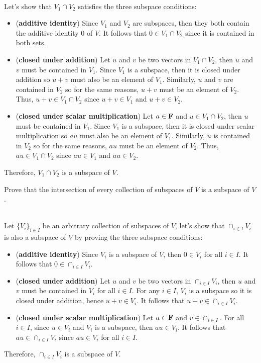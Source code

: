 \begin{solution}
    \\ Let's show that $V_1 \cap V_2$ satisfies the three subspace conditions:
    \begin{itemize}
        \item (\textbf{additive identity}) Since $V_1$ and $V_2$ are subspaces, then they both contain the additive identity $0$ of $V$. It follows that $0 \in V_1 \cap V_2$ since it is contained in both sets.
        \item (\textbf{closed under addition}) Let $u$ and $v$ be two vectors in $V_1 \cap V_2$, then $u$ and $v$ must be contained in $V_1$. Since $V_1$ is a subspace, then it is closed under addition so $u+v$ must also be an element of $V_1$. Similarly, $u$ and $v$ are contained in $V_2$ so for the same reasons, $u+v$ must be an element of $V_2$. Thus, $u+v \in V_1 \cap V_2$ since $u+v \in V_1$ and $u+v \in V_2$.
        \item (\textbf{closed under scalar multiplication}) Let $a \in \mathbf{F}$ and $u \in V_1 \cap V_2$, then $u$ must be contained in $V_1$. Since $V_1$ is a subspace, then it is closed under scalar multiplication so $au$ must also be an element of $V_1$. Similarly, $u$ is contained in $V_2$ so for the same reasons, $au$ must be an element of $V_2$. Thus, $au \in V_1 \cap V_2$ since $au \in V_1$ and $au \in V_2$.
    \end{itemize}
    Therefore, $V_1 \cap V_2$ is a subspace of $V$. \\
\end{solution}

\begin{exercise}
    Prove that the intersection of every collection of subspaces of $V$ is a subspace of $V$. \\
\end{exercise}

\begin{solution}
    \\ Let $\{V_i\}_{i \in I}$ be an arbitrary collection of subspaces of $V$, let's show that $\cap_{i \in I}V_i$ is also a subspace of $V$ by proving the three subspace conditions:
    \begin{itemize}
        \item (\textbf{additive identity}) Since $V_i$ is a subspace of $V$, then $0 \in V_i$ for all $i \in I$. It follows that $0 \in \cap_{i \in I} V_i$.
        \item (\textbf{closed under addition}) Let $u$ and $v$ be two vectors in $\cap_{i \in I} V_i$, then $u$ and $v$ must be contained in $V_i$ for all $i \in I$. For any $i \in I$, $V_i$ is a subspace so it is closed under addition, hence $u+v \in V_i$. It follows that $u +v \in \cap_{i \in I}V_i$.
        \item (\textbf{closed under scalar multiplication}) Let $a \in \mathbf{F}$ and $v \in \cap_{i \in I}$. For all $i \in I$, since $u \in V_i$ and $V_i$ is a subspace, then $au \in V_i$. It follows that $au \in \cap_{i \in I}V_i$ since $au \in V_i$ for all $i \in I$.
    \end{itemize}
    Therefore, $\cap_{i \in I}V_i$ is a subspace of $V$.\\
\end{solution}

